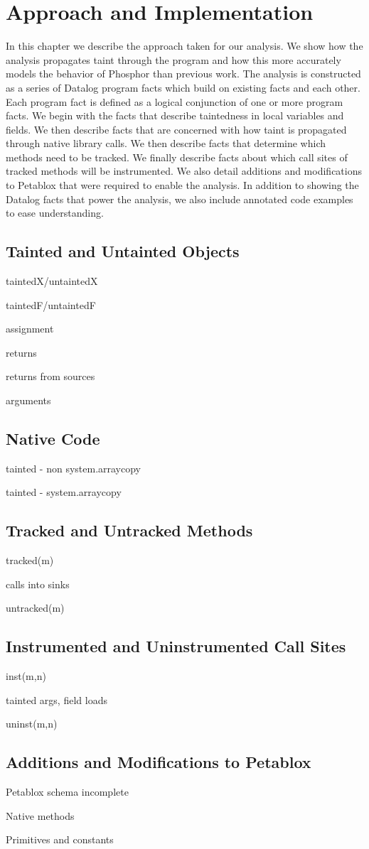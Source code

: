 \chapter{Approach and Implementation}
In this chapter we describe the approach taken for our analysis. We show how the analysis propagates taint through the program and how this more accurately models the behavior of Phosphor than previous work. The analysis is constructed as a series of Datalog program facts which build on existing facts and each other. Each program fact is defined as a logical conjunction of one or more program facts. We begin with the facts that describe taintedness in local variables and fields. We then describe facts that are concerned with how taint is propagated through native library calls. We then describe facts that determine which methods need to be tracked. We finally describe facts about which call sites of tracked methods will be instrumented. We also detail additions and modifications to Petablox that were required to enable the analysis. In addition to showing the Datalog facts that power the analysis, we also include annotated code examples to ease understanding.
\section{Tainted and Untainted Objects}
taintedX/untaintedX

taintedF/untaintedF

assignment

returns

returns from sources

arguments
\section{Native Code}
tainted - non system.arraycopy

tainted - system.arraycopy
\section{Tracked and Untracked Methods}
tracked(m)

calls into sinks

untracked(m)
\section{Instrumented and Uninstrumented Call Sites}
inst(m,n)

tainted args, field loads

uninst(m,n)
\section{Additions and Modifications to Petablox}
Petablox schema incomplete

Native methods

Primitives and constants
